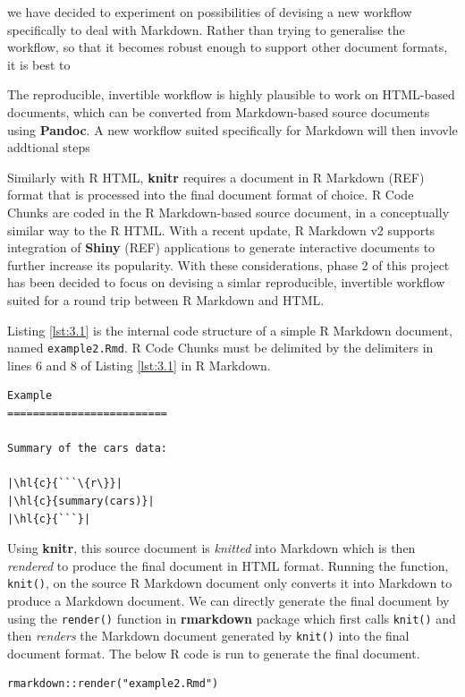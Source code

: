 \documentclass[a4paper, 12pt]{report}
\begin{document}
we have decided to experiment on possibilities of devising a new workflow specifically to deal with Markdown. Rather than trying to generalise the workflow, so that it becomes robust enough to support other document formats, it is best to 



The reproducible, invertible workflow is highly plausible to work on HTML-based documents, which can be converted from Markdown-based source documents using \textbf{Pandoc}. A new workflow suited specifically for Markdown will then invovle addtional steps 

Similarly with R HTML, \textbf{knitr} requires a document in R Markdown (REF) format that is processed into the final document format of choice. R Code Chunks are coded in the R Markdown-based source document, in a conceptually similar way to the R HTML. With a recent update, R Markdown v2 supports integration of \textbf{Shiny} (REF) applications to generate interactive documents to further increase its popularity. With these considerations, phase 2 of this project has been decided to focus on devising a simlar reproducible, invertible workflow suited for a round trip between R Markdown and HTML.

Listing \ref{lst:3.1} is the internal code structure of a simple R Markdown document, named \texttt{example2.Rmd}. R Code Chunks must be delimited by the delimiters in lines 6 and 8 of Listing \ref{lst:3.1} in R Markdown.

\begin{lstlisting}[caption={\texttt{example2.Rmd}}, escapechar=\|, label={lst:3.1}]
Example
=========================

Summary of the cars data:

|\hl{c}{```\{r\}}|
|\hl{c}{summary(cars)}|
|\hl{c}{```}|
\end{lstlisting}

Using \textbf{knitr}, this source document is \emph{knitted} into Markdown which is then \emph{rendered} to produce the final document in HTML format. Running the function, \texttt{knit()}, on the source R Markdown document only converts it into Markdown to produce a Markdown document. We can directly generate the final document by using the \texttt{render()} function in \textbf{rmarkdown} package which first calls \texttt{knit()} and then \emph{renders} the Markdown document generated by \texttt{knit()} into the final document format. The below R code is run to generate the final document.

\begin{lstlisting}[numbers=none]
rmarkdown::render("example2.Rmd")
\end{lstlisting}
\end{document}
